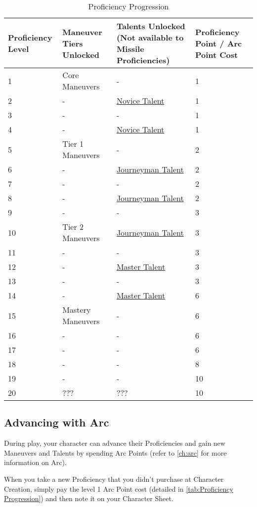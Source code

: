 \documentclass[oneside,11pt,english]{book}
\begin{document}
\begin{longtabu} spread 0pt {X[-2,c] X[c] X[c] X[-1,c]}
	\caption{Proficiency Progression}
	\label{tab:Proficiency Progression}\\
	\rowfont[c]{}Proficiency Level&Maneuver Tiers Unlocked&Talents Unlocked (Not available to Missile Proficiencies)&Proficiency Point / Arc Point Cost\\&	Core Maneuvers&	-&	1\\
	2&	-& 	\hyperref[sec:Novice Talents]{Novice Talent}&	1\\
	3&	-& 	-&	1\\
	4&	-& 	\hyperref[sec:Novice Talents]{Novice Talent}&1\\
	5&	Tier 1 Maneuvers&	-&	2 \\
	6&	-&  	\hyperref[sec:Journeyman Talents]{Journeyman Talent}&2 \\
	7&	-&  	-  	&2 \\
	8&	-&  	\hyperref[sec:Journeyman Talents]{Journeyman Talent}		&2 \\
	9&	-&  	-  	&3 \\
	10&	Tier 2 Maneuvers&	\hyperref[sec:Journeyman Talents]{Journeyman Talent}		&3 \\
	11&	-&  	-  	&3 \\
	12&	-&  	\hyperref[sec:Master Talents]{Master Talent}  	&3 \\
	13&	-&  	-  	&3 \\
	14&	-&  	\hyperref[sec:Master Talents]{Master Talent}  	&6 \\
	15&	Mastery Maneuvers&	-&	6 \\
	16&	-&-&6 \\
	17&	-&-&6 \\
	18&	-&-&8 \\
	19&	-&-&10 \\
	20&	???&  	???  	&10\\
\end{longtabu}

\subsection{Advancing with Arc}

During play, your character can advance their Proficiencies and gain new Maneuvers and Talents by spending Arc Points (refer to \autoref{ch:arc} for more information on Arc).

When you take a new Proficiency that you didn’t purchase at Character Creation, simply pay the level 1 Arc Point cost (detailed in \autoref{tab:Proficiency Progression}) and then note it on your Character Sheet.
\end{document}
